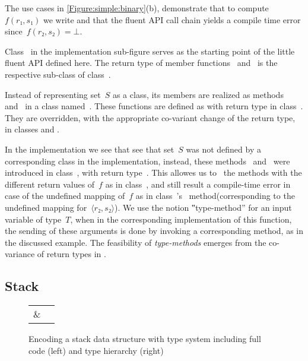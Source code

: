 The use cases in \cref{Figure:simple:binary}(b), demonstrate
  that to compute~$f(r₁,s₁)$ we write 
  and that the fluent API call chain  yields
  a compile time error since~$f(r₂, s₂)=⊥$.

Class~ in the implementation sub-figure serves as
  the starting point of the little fluent API defined here.
The return type of  member functions~ and~
is the respective sub-class of class~.

Instead of representing set~$S$ as a class,
  its members are realized as methods~ and~ in a class
  named~.
These functions are defined as  with return type 
  in class~.
They are overridden, with the appropriate co-variant change of the return type,
  in classes  and .

In the implementation we see that see that set~$S$ was not defined by a corresponding class in
  the implementation, instead, these methods~ and~ were introduced in
  class~, with return type~.
This allowes us to~ the methods with the different return values of~$f$ as
 in class~, and still result a compile-time error in case of the undefined mapping of~$f$
 as in class~'s~ method(corresponding to the undefined mapping for~$⟨r₂, s₂⟩$).
We use the notion ‟type-method” for an input variable of type~$T$, when in the
  corresponding implementation of this function, the sending of these arguments is done
  by invoking a corresponding method, as in the discussed example.
The feasibility of \emph{type-methods} emerges from the co-variance of return types in
  \Java.


\subsection{Stack}
\begin{figure}[htb]
    \caption{Encoding a stack data structure with
    \Java type system including full code (left) and type hierarchy (right)}\label{Figure:stack:encoding}
    \begin{tabular}{cc}
         \parbox[c]{0.74\linewidth}{
      }
        &
         \parbox[c]{\hsize}{
          
        }
    \end{tabular}
\end{figure}

